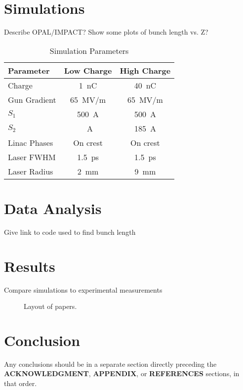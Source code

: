 \documentclass[letterpaper,  %
              ]{jacow-2_3}   %
\newcommand\SEC[1]{\textbf{\uppercase{#1}}}
\begin{document}
\section{Simulations}
Describe OPAL/IMPACT? Show some plots of bunch length vs. Z?
\begin{table}[hbt]
	\centering
	\caption{Simulation Parameters}
	\begin{tabular}{lcc}
		\toprule
		\textbf{Parameter} & \textbf{Low Charge}  & \textbf{High Charge} \\
		\midrule
		Charge       & \SI{1}{nC}        & \SI{40}{nC}    \\ %
		Gun Gradient & \SI{65}{MV/m}     & \SI{65}{MV/m}  \\ %
		$S_1$        & \SI{500}{A}		 & \SI{500}{A}	  \\
		$S_2$		 & \SI{}{A}   	 & \SI{185}{A}		 \\
		Linac Phases & On crest          & On crest       \\
		Laser FWHM   & \SI{1.5}{ps}      & \SI{1.5}{ps}   \\ %
		Laser Radius & \SI{2}{mm}        & \SI{9}{mm}     \\
		\bottomrule
	\end{tabular}
	\label{simparam}
\end{table}


\section{Data Analysis}
Give link to code used to find bunch length

\section{Results}
Compare simulations to experimental measurements
\begin{figure}[!htb]
	\centering
	\caption{Layout of papers.}
	\label{l2ea4-f1}
\end{figure}

\section{Conclusion}
Any conclusions should be in a separate section directly preceding
the \SEC{Acknowledgment}, \SEC{Appendix}, or \SEC{References} sections, in that
order.
\end{document}
